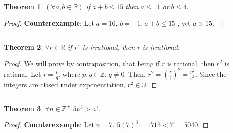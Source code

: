 \documentclass{article}
\newtheorem{genthm}{Theorem}
\newcommand{\Z}{\mathbb{Z}}
\newcommand{\Q}{\mathbb{Q}}
\newcommand{\R}{\mathbb{R}}
\begin{document}
\subsection{}

\begin{genthm}
    \((\forall a, b \in \R)\) if \(a + b \leqslant 15\) then \(a \leqslant 11\) or \(b \leqslant 4\).
\end{genthm}
\begin{proof}
\textbf{Counterexample}: Let \(a = 16\), \(b = -1\).
\(a + b \leqslant 15\) , yet \(a > 15\).
\end{proof}

\subsection{}

\begin{genthm}
    \(\forall r \in \R\) if \(r^2\) is irrational, then \(r\) is irrational.
\end{genthm}
\begin{proof}
We will prove by contraposition, that being if \(r\) is rational, then \(r^2\) is rational.
Let \(r = \frac{p}{q}\), where \(p, q \in \Z\), \(q \neq 0\).
Then, \(r^2 = \left(\frac{p}{q}\right)^2 = \frac{p^2}{q^2}\).
Since the integers are closed under exponentiation, \(r^2 \in \Q\).
\end{proof}

\subsection{}

\begin{genthm}
    \(\forall n \in \Z^+\) \(5n^3 > n!\).
\end{genthm}
\begin{proof}
\textbf{Counterexample}: Let \(n = 7\).
\(5 (7)^3 = 1715 < 7! = 5040.\)
\end{proof}
\end{document}
